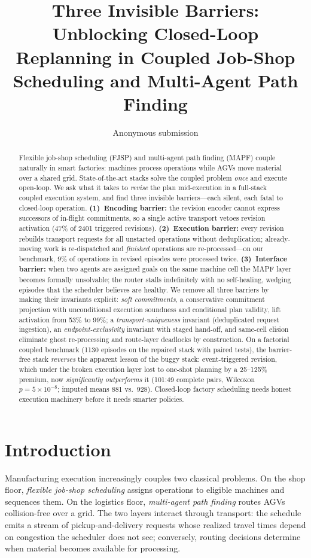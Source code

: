 \documentclass[twocolumn]{article}
\title{Three Invisible Barriers: Unblocking Closed-Loop\\
Replanning in Coupled Job-Shop Scheduling and Multi-Agent Path Finding}
\author{Anonymous submission}
\date{}
\begin{document}
\maketitle

\begin{abstract}
Flexible job-shop scheduling (FJSP) and multi-agent path finding (MAPF)
couple naturally in smart factories: machines process operations while
AGVs move material over a shared grid. State-of-the-art stacks solve the
coupled problem \emph{once} and execute open-loop. We ask what it takes
to \emph{revise} the plan mid-execution in a full-stack coupled execution system, and find three invisible barriers---each silent, each fatal to
closed-loop operation. \textbf{(1)~Encoding barrier:} the revision
encoder cannot express successors of in-flight commitments, so a single
active transport vetoes revision activation (47\% of 2401 triggered
revisions). \textbf{(2)~Execution barrier:} every revision rebuilds
transport requests for all unstarted operations without deduplication;
already-moving work is re-dispatched and \emph{finished} operations are
re-processed---on our benchmark, 9\% of operations in revised episodes
were processed twice. \textbf{(3)~Interface barrier:} when two agents
are assigned goals on the same machine cell the MAPF layer becomes
formally unsolvable; the router stalls indefinitely with no
self-healing, wedging episodes that the scheduler believes are healthy.
We remove all three barriers by making their invariants explicit:
\emph{soft commitments}, a conservative commitment projection with
unconditional execution soundness and conditional plan validity, lift
activation from 53\% to 99\%; a \emph{transport-uniqueness} invariant
(deduplicated request ingestion), an \emph{endpoint-exclusivity}
invariant with staged hand-off, and same-cell elision eliminate ghost
re-processing and route-layer deadlocks by construction. On a
factorial coupled benchmark (1130 episodes on the repaired stack with
paired tests), the barrier-free stack \emph{reverses} the apparent
lesson of the buggy stack: event-triggered revision, which under the
broken execution layer lost to one-shot planning by a 25--125\%
premium, now \emph{significantly outperforms} it (101:49 complete
pairs, Wilcoxon $p=5\times10^{-8}$; imputed means 881 vs.\ 928). Closed-loop factory scheduling
needs honest execution machinery before it needs smarter policies.
\end{abstract}

\section{Introduction}
Manufacturing execution increasingly couples two classical problems.
On the shop floor, \emph{flexible job-shop scheduling} assigns operations
to eligible machines and sequences them. On the logistics floor,
\emph{multi-agent path finding} routes AGVs collision-free over a grid.
The two layers interact through transport: the schedule emits a stream of
pickup-and-delivery requests whose realized travel times depend on
congestion the scheduler does not see; conversely, routing decisions
determine when material becomes available for processing.
\end{document}
